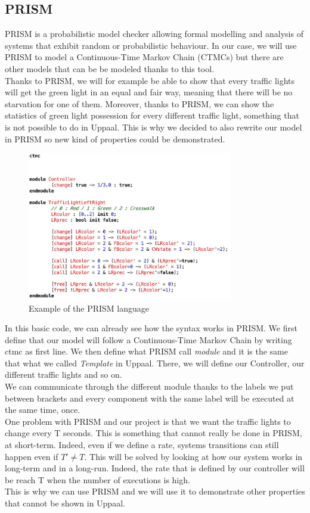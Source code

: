  \subsection{PRISM}
 PRISM is a probabilistic model checker allowing formal modelling and analysis of systems that exhibit random or probabilistic behaviour. In our case, we will use PRISM to model a Continuous-Time Markov Chain (CTMCs) but there are other models that can be be modeled thanks to this tool. \\
 Thanks to PRISM, we will for example be able to show that every traffic lights will get the green light in an equal and fair way, meaning that there will be no starvation for one of them. Moreover, thanks to PRISM, we can show the statistics of green light possession for every different traffic light, something that is not possible to do in Uppaal. This is why we decided to also rewrite our model in PRISM so new kind of properties could be demonstrated.
 \begin{figure}[h]\label{fig:prism}
  \begin{center}
    \includegraphics[width=0.8\textwidth]{picture/prism.png}
    \caption{Example of the PRISM language}
  \end{center}
\end{figure} 

\noindent In this basic code, we can already see how the syntax works in PRISM. We first define that our model will follow a Continuous-Time Markov Chain by writing ctmc as first line. We then define what PRISM call \textit{module} and it is the same that what we called \textit{Template} in Uppaal. There, we will define our Controller, our different traffic lights and so on. \\
We can communicate through the different module thanks to the labels we put between brackets and every component with the same label will be executed at the same time, once. \\
One problem with PRISM and our project is that we want the traffic lights to change every T seconds. This is something that cannot really be done in PRISM, at short-term. Indeed, even if we define a rate, systems transitions can still happen even if $T' \ne T $. This will be solved by looking at how our system works in long-term and in a long-run. Indeed, the rate that is defined by our controller will be reach T when the number of executions is high. \\ 
This is why we can use PRISM and we will use it to demonstrate other properties that cannot be shown in Uppaal.
